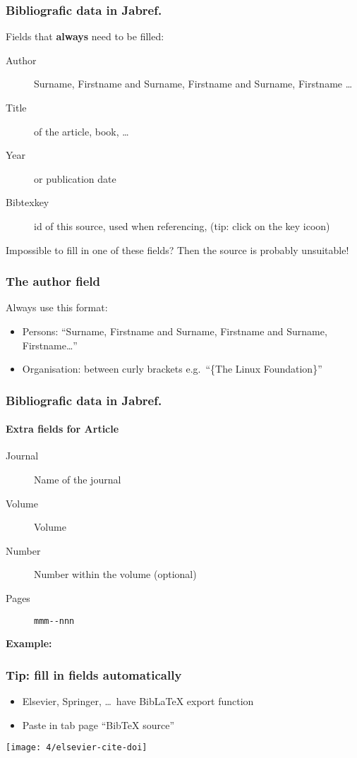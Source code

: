 \documentclass[aspectratio=169]{beamer}
\begin{document}
\begin{frame}
  \frametitle{Bibliografic data in Jabref.}

  Fields that \textbf{always} need to be filled:

  \begin{description}
    \item[Author] Surname, Firstname and Surname, Firstname and Surname, Firstname \ldots
    \item[Title] of the article, book, \ldots
    \item[Year] or publication date
    \item[Bibtexkey] id of this source, used when referencing, (tip: click on the key icoon)
  \end{description}
  \bigskip
  Impossible to fill in one of these fields? Then the source is probably unsuitable!
\end{frame}

\begin{frame}
  \frametitle{The author field}

  Always use this format:

  \begin{itemize}
    \item Persons: ``Surname, Firstname and Surname, Firstname and Surname, Firstname\ldots''
    \item Organisation: between curly brackets e.g.\ ``\{The Linux Foundation\}''
  \end{itemize}

\end{frame}

\begin{frame}[fragile]
  \frametitle{Bibliografic data in Jabref.}
  \framesubtitle{Extra fields for Article}

  \begin{description}
    \item[Journal] Name of the journal
    \item[Volume] Volume
    \item[Number] Number within the volume (optional)
    \item[Pages] \verb|mmm--nnn|
  \end{description}

  \bigskip

  \textbf{Example:}

\end{frame}

\begin{frame}
  \frametitle{Tip: fill in fields automatically}

  \begin{itemize}
    \item Elsevier, Springer, \ldots\ have Bib\LaTeX{} export function
    \item Paste in tab page ``BibTeX source''
  \end{itemize}

  \bigskip

  \centering
  \texttt{[image: 4/elsevier-cite-doi]}

\end{frame}
\end{document}
